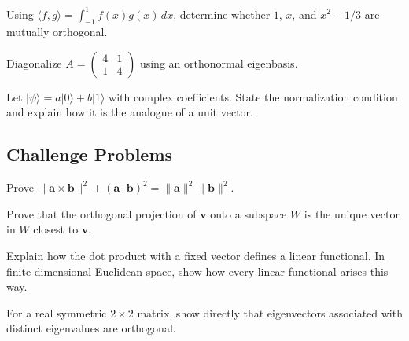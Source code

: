 \begin{chapterexercise}
Using $\langle f,g\rangle=\int_{-1}^{1}f(x)g(x)\,dx$, determine whether $1$, $x$, and $x^2-1/3$ are mutually orthogonal.
\end{chapterexercise}
\begin{chapterexercise}[Eigenbasis]
Diagonalize $A=\begin{pmatrix}4&1\\1&4\end{pmatrix}$ using an orthonormal eigenbasis.
\end{chapterexercise}
\begin{chapterexercise}
Let $|\psi\rangle=a|0\rangle+b|1\rangle$ with complex coefficients. State the normalization condition and explain how it is the analogue of a unit vector.
\end{chapterexercise}

\subsection*{Challenge Problems}
\begin{chapterexercise}
Prove $\lVert\mathbf a\times\mathbf b\rVert^2+(\mathbf a\cdot\mathbf b)^2=\lVert\mathbf a\rVert^2\lVert\mathbf b\rVert^2$.
\end{chapterexercise}
\begin{chapterexercise}
Prove that the orthogonal projection of $\mathbf v$ onto a subspace $W$ is the unique vector in $W$ closest to $\mathbf v$.
\end{chapterexercise}
\begin{chapterexercise}
Explain how the dot product with a fixed vector defines a linear functional. In finite-dimensional Euclidean space, show how every linear functional arises this way.
\end{chapterexercise}
\begin{chapterexercise}
For a real symmetric $2\times2$ matrix, show directly that eigenvectors associated with distinct eigenvalues are orthogonal.
\end{chapterexercise}
